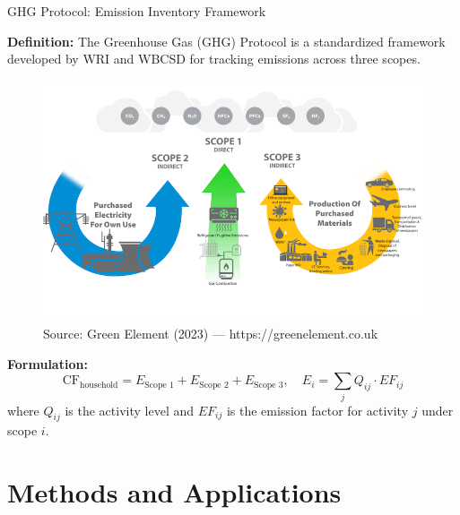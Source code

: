 \documentclass{beamer}
\begin{document}
\begin{frame}{GHG Protocol: Emission Inventory Framework}
\small
\vspace{-2.5em}

\footnotesize \textbf{Definition:}  
The Greenhouse Gas (GHG) Protocol is a standardized framework developed by WRI and WBCSD for tracking emissions across three scopes.
\vspace{-0.5em}
\begin{figure}[h]
  \centering
  \includegraphics[width=0.55\linewidth]{ghg scope.png}
  \caption*{\tiny Source: Green Element (2023) — https://greenelement.co.uk}
\end{figure}
\vspace{-1.0em}
\footnotesize \textbf{Formulation:}
\[
\text{CF}_{\text{household}} = E_{\text{Scope 1}} + E_{\text{Scope 2}} + E_{\text{Scope 3}}, \quad 
E_i = \sum_j Q_{ij} \cdot EF_{ij}
\]
{\footnotesize where $Q_{ij}$ is the activity level and $EF_{ij}$ is the emission factor for activity $j$ under scope $i$.}

\end{frame}

\section{Methods and Applications}
\end{document}
